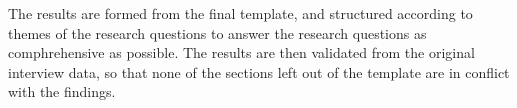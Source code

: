 \documentclass[english]{tktltiki2}
\theoremstyle{definition}
\theoremstyle{remark}
\begin{document}
The results are formed from the final template, and structured according to themes of the research questions to answer the research questions as comphrehensive as possible. The results are then validated from the original interview data, so that none of the sections left out of the template are in conflict with the findings.







\end{document}
